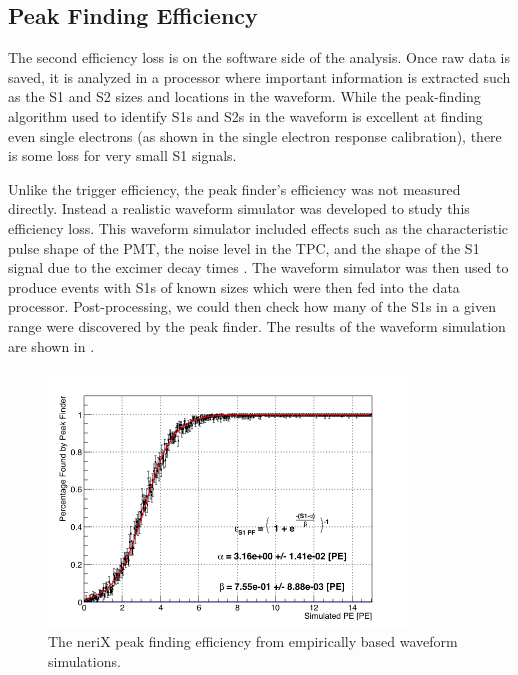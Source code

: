 \subsection{Peak Finding Efficiency}
\label{sec:nerix_pf_efficiency}

The second efficiency loss is on the software side of the analysis.  Once raw data is saved, it is analyzed in a processor where important information is extracted such as the S1 and S2 sizes and locations in the waveform.  While the peak-finding algorithm used to identify S1s and S2s in the waveform is excellent at finding even single electrons (as shown in the single electron response calibration), there is some loss for very small S1 signals.  

Unlike the trigger efficiency, the peak finder's efficiency was not measured directly.  Instead a realistic waveform simulator was developed to study this efficiency loss.  This waveform simulator included effects such as the characteristic pulse shape of the PMT, the noise level in the TPC, and the shape of the S1 signal due to the excimer decay times \cite{hitachi1983effect}.  The waveform simulator was then used to produce events with S1s of known sizes which were then fed into the data processor.  Post-processing, we could then check how many of the S1s in a given range were discovered by the peak finder.  The results of the waveform simulation are shown in .

\begin{figure}[t]
        \centering
	\includegraphics[width=0.85\textwidth]{nerix_peak_finder_efficiency}
	\caption{The neriX peak finding efficiency from empirically based waveform simulations.}
	\label{fig:nerix_peak_finder_efficiency}
\end{figure}





